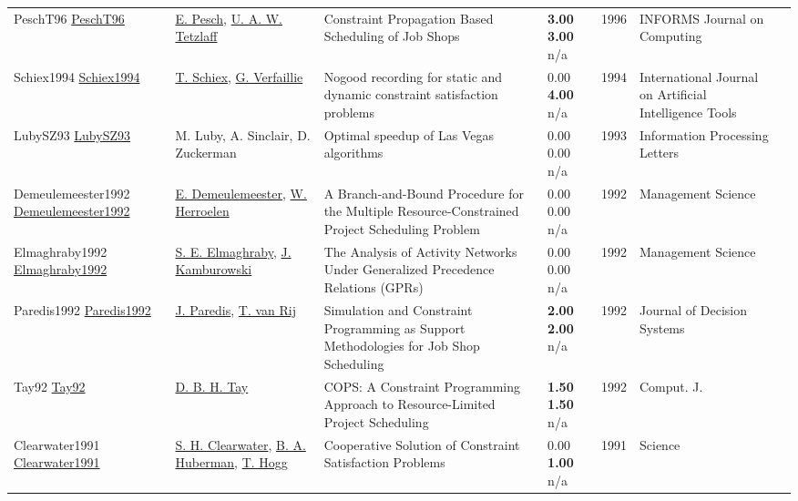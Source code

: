 {\begin{longtable}{p{3cm}p{5cm}p{10cm}p{1cm}rp{2.5cm}l}
PeschT96 \href{http://dx.doi.org/10.1287/ijoc.8.2.144}{PeschT96} & \hyperref[auth:a437]{E. Pesch}, \hyperref[auth:a1215]{U. A. W. Tetzlaff} & Constraint Propagation Based Scheduling of Job Shops & \noindent{}\textbf{3.00} \textbf{3.00} n/a & 1996 & \cellcolor{red!20}INFORMS Journal on Computing & \cite{PeschT96}\\
Schiex1994 \href{http://dx.doi.org/10.1142/s0218213094000108}{Schiex1994} & \hyperref[auth:a1718]{T. Schiex}, \hyperref[auth:a1719]{G. Verfaillie} & Nogood recording for static and dynamic constraint satisfaction problems & \noindent{}\textcolor{black!50}{0.00} \textbf{4.00} n/a & 1994 & International Journal on Artificial Intelligence Tools & \cite{Schiex1994}\\
LubySZ93 \href{http://dx.doi.org/10.1016/0020-0190(93)90029-9}{LubySZ93} & M. Luby, A. Sinclair, D. Zuckerman & Optimal speedup of Las Vegas algorithms & \noindent{}\textcolor{black!50}{0.00} \textcolor{black!50}{0.00} n/a & 1993 & Information Processing Letters & \cite{LubySZ93}\\
Demeulemeester1992 \href{http://dx.doi.org/10.1287/mnsc.38.12.1803}{Demeulemeester1992} & \hyperref[auth:a1089]{E. Demeulemeester}, \hyperref[auth:a1101]{W. Herroelen} & A Branch-and-Bound Procedure for the Multiple Resource-Constrained Project Scheduling Problem & \noindent{}\textcolor{black!50}{0.00} \textcolor{black!50}{0.00} n/a & 1992 & Management Science & \cite{Demeulemeester1992}\\
Elmaghraby1992 \href{http://dx.doi.org/10.1287/mnsc.38.9.1245}{Elmaghraby1992} & \hyperref[auth:a1770]{S. E. Elmaghraby}, \hyperref[auth:a1771]{J. Kamburowski} & The Analysis of Activity Networks Under Generalized Precedence Relations (GPRs) & \noindent{}\textcolor{black!50}{0.00} \textcolor{black!50}{0.00} n/a & 1992 & Management Science & \cite{Elmaghraby1992}\\
Paredis1992 \href{http://dx.doi.org/10.1080/12460125.1992.10511509}{Paredis1992} & \hyperref[auth:a1995]{J. Paredis}, \hyperref[auth:a1996]{T. van Rij} & Simulation and Constraint Programming as Support Methodologies for Job Shop Scheduling & \noindent{}\textbf{2.00} \textbf{2.00} n/a & 1992 & Journal of Decision Systems & \cite{Paredis1992}\\
Tay92 \href{}{Tay92} & \hyperref[auth:a700]{D. B. H. Tay} & {COPS:} {A} Constraint Programming Approach to Resource-Limited Project Scheduling & \noindent{}\textbf{1.50} \textbf{1.50} n/a & 1992 & Comput. J. & \cite{Tay92}\\
Clearwater1991 \href{http://dx.doi.org/10.1126/science.254.5035.1181}{Clearwater1991} & \hyperref[auth:a1773]{S. H. Clearwater}, \hyperref[auth:a1774]{B. A. Huberman}, \hyperref[auth:a1775]{T. Hogg} & Cooperative Solution of Constraint Satisfaction Problems & \noindent{}\textcolor{black!50}{0.00} \textbf{1.00} n/a & 1991 & Science & \cite{Clearwater1991}\\

\end{longtable}}
